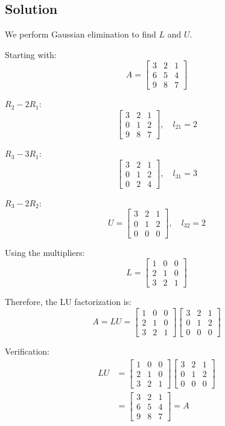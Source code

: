 \subsection*{Solution}

We perform Gaussian elimination to find $L$ and $U$.

Starting with:
\[
	A = \begin{bmatrix}
		3 & 2 & 1 \\
		6 & 5 & 4 \\
		9 & 8 & 7
	\end{bmatrix}
\]

$R_2 - 2R_1$:
\[
	\begin{bmatrix}
		3 & 2 & 1 \\
		0 & 1 & 2 \\
		9 & 8 & 7
	\end{bmatrix}, \quad l_{21} = 2
\]

$R_3 - 3R_1$:
\[
	\begin{bmatrix}
		3 & 2 & 1 \\
		0 & 1 & 2 \\
		0 & 2 & 4
	\end{bmatrix}, \quad l_{31} = 3
\]

$R_3 - 2R_2$:
\[
	U = \begin{bmatrix}
		3 & 2 & 1 \\
		0 & 1 & 2 \\
		0 & 0 & 0
	\end{bmatrix}, \quad l_{32} = 2
\]

Using the multipliers:
\[
	L = \begin{bmatrix}
		1 & 0 & 0 \\
		2 & 1 & 0 \\
		3 & 2 & 1
	\end{bmatrix}
\]

Therefore, the LU factorization is:
\[
	{A = LU = \begin{bmatrix}
		1 & 0 & 0 \\
		2 & 1 & 0 \\
		3 & 2 & 1
	\end{bmatrix} \begin{bmatrix}
		3 & 2 & 1 \\
		0 & 1 & 2 \\
		0 & 0 & 0
	\end{bmatrix}}
\]

Verification:
\begin{align*}
	LU &= \begin{bmatrix}
		1 & 0 & 0 \\
		2 & 1 & 0 \\
		3 & 2 & 1
	\end{bmatrix} \begin{bmatrix}
		3 & 2 & 1 \\
		0 & 1 & 2 \\
		0 & 0 & 0
	\end{bmatrix} \\
	&= \begin{bmatrix}
		3 & 2 & 1 \\
		6 & 5 & 4 \\
		9 & 8 & 7
	\end{bmatrix} = A
\end{align*}
